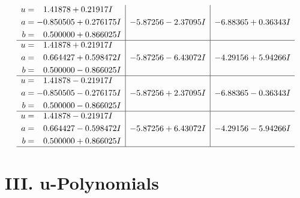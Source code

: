 \documentclass[1p]{elsarticle_modified}
\theoremstyle{definition}
\begin{document}
$$\begin{array}{c|c|c}
\begin{aligned}
u &= \phantom{-}1.41878 + 0.21917 I \\
a &= -0.850505 + 0.276175 I \\
b &= \phantom{-}0.500000 + 0.866025 I\end{aligned}
 & -5.87256 - 2.37095 I & -6.88365 + 0.36343 I \\ \hline\begin{aligned}
u &= \phantom{-}1.41878 + 0.21917 I \\
a &= \phantom{-}0.664427 + 0.598472 I \\
b &= \phantom{-}0.500000 - 0.866025 I\end{aligned}
 & -5.87256 - 6.43072 I & -4.29156 + 5.94266 I \\ \hline\begin{aligned}
u &= \phantom{-}1.41878 - 0.21917 I \\
a &= -0.850505 - 0.276175 I \\
b &= \phantom{-}0.500000 - 0.866025 I\end{aligned}
 & -5.87256 + 2.37095 I & -6.88365 - 0.36343 I \\ \hline\begin{aligned}
u &= \phantom{-}1.41878 - 0.21917 I \\
a &= \phantom{-}0.664427 - 0.598472 I \\
b &= \phantom{-}0.500000 + 0.866025 I\end{aligned}
 & -5.87256 + 6.43072 I & -4.29156 - 5.94266 I\\
 \hline 
 \end{array}$$\newpage
\newpage\renewcommand{\arraystretch}{1}
\centering \section*{ III. u-Polynomials}
\end{document}

